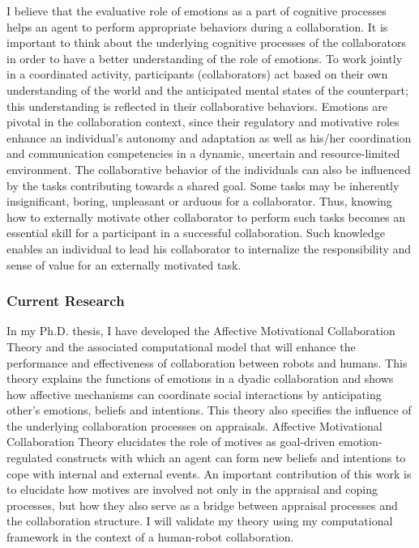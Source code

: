 \documentclass[a4paper, 10pt]{article}
\begin{document}
\begin{small}
I believe that the evaluative role of emotions as a part of cognitive processes
helps an agent to perform appropriate behaviors during a collaboration. It is
important to think about the underlying cognitive processes of the collaborators
in order to have a better understanding of the role of emotions. To work jointly
in a coordinated activity, participants (collaborators) act based on their own
understanding of the world and the anticipated mental states of the counterpart;
this understanding is reflected in their collaborative behaviors. Emotions are
pivotal in the collaboration context, since their regulatory and motivative
roles enhance an individual's autonomy and adaptation as well as his/her
coordination and communication competencies in a dynamic, uncertain and
resource-limited environment. The collaborative behavior of the individuals can
also be influenced by the tasks contributing towards a shared goal. Some tasks
may be inherently insignificant, boring, unpleasant or arduous for a
collaborator. Thus, knowing how to externally motivate other collaborator to
perform such tasks becomes an essential skill for a participant in a successful
collaboration. Such knowledge enables an individual to lead his collaborator to
internalize the responsibility and sense of value for an externally motivated
task.

\subsubsection*{Current Research}

In my Ph.D. thesis, I have developed the Affective Motivational Collaboration
Theory and the associated computational model that will enhance the performance
and effectiveness of collaboration between robots and humans. This theory
explains the functions of emotions in a dyadic collaboration and shows how
affective mechanisms can coordinate social interactions by anticipating other's
emotions, beliefs and intentions. This theory also specifies the influence of
the underlying collaboration processes on appraisals. Affective Motivational
Collaboration Theory elucidates the role of motives as goal-driven
emotion-regulated constructs with which an agent can form new beliefs and
intentions to cope with internal and external events. An important contribution
of this work is to elucidate how motives are involved not only in the appraisal
and coping processes, but how they also serve as a bridge between appraisal
processes and the collaboration structure. I will validate my theory using my
computational framework in the context of a human-robot collaboration.


\end{small}
\end{document}
